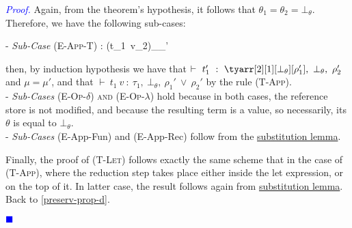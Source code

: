 \documentclass[a4paper,11pt,oneside]{article}
\theoremstyle{plain}
\newtheorem{lemma}[definition]{Lemma}
\renewenvironment{proof}{\noindent \begin{adjustwidth}{1.5em}{} \textcolor{blue}{\textit{Proof.}}}
{{\begin{tiny}\textcolor{blue}{$\blacksquare$}\end{tiny}}
\end{adjustwidth}~\\\noindent}
\newcommand{\bwedge}{\boldsymbol{~\wedge~}}
\newcommand{\bvee}{\boldsymbol{~\vee~}}
\newcommand{\brarr}{\boldsymbol{~\Rightarrow~}}
\newcommand{\typing}[4]{\vdash~#1~:~#2,~#3,~#4}
\newcommand{\bth}{\bot_\theta}
\newcommand{\hookdownarrow}{\mathrel{\rotatebox[origin=c]{180}{$\hookleftarrow$}}}
\newcommand{\inlletarr}{\hookdownarrow}
\newcommand{\inlletstar}{\hookdownarrow^{\star}}
\newcommand{\inlletplus}{\inlletstar}
\newcommand{\mem}{_{\mu}}\newcommand{\memp}{_{\mu'}}
\begin{document}
\begin{proof}
Again, from the theorem's hypothesis, it follows that $\theta_1 = \theta_2 = \bth$.
Therefore, we have the following sub-cases: 

- \textit{Sub-Case} \textsc{(E-App-T)} :
 \infrule[E-App-T]	
	{{t_{1}}\mem \rightarrow {{t'}_{1}}\memp}
	{{(t_{1}~v_2)}\mem {}\memp}
	
then, by induction hypothesis we have that $\typing{t'_1}{\tyarr[2][1][\bth][\rho_1']}{\bth}{\rho_2'}$ and $\mu = \mu'$, and that $\typing{t_1~v}{\tau_1}{\bth}{\rho_1' \bvee \rho_2'}$ by the rule \textsc{(T-App)}. \\

- \textit{Sub-Cases}	\textsc{(E-Op-$\delta$) and (E-Op-$\lambda$)} hold because in both cases, the reference store is not modified, and because the resulting term is a value, so necessarily, its $\theta$ is equal to $\bth$. \\
		
- \textit{Sub-Cases} (E-App-Fun) and  (E-App-Rec) follow from the \hyperlink{subst-lemma}{substitution lemma}.

Finally, the proof of \textsc{(T-Let)} follows exactly the same scheme that in the case of \textsc{(T-App)}, where the reduction step takes place either inside the let expression, or on the top of it.
 In latter case, the result follows again from \hyperlink{subst-lemma}{substitution lemma}. Back to \ref{preserv-prop-d}.
\end{proof}  	

	


	
\end{document}
